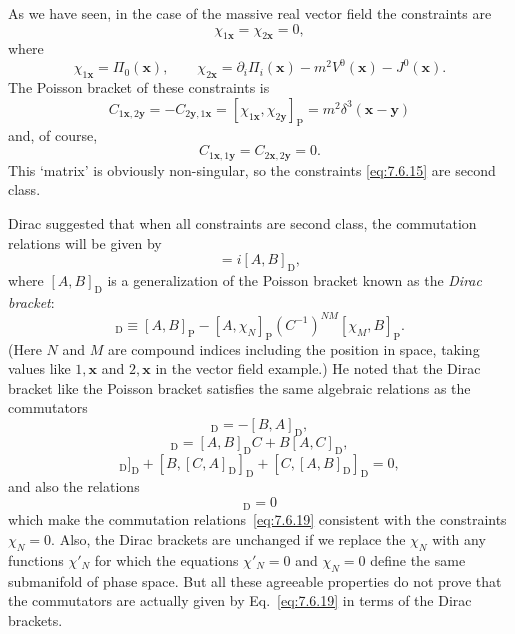 As we have seen, in the case of the massive real vector field the constraints
are
\begin{equation}
\chi_{1\mathbf x}=\chi_{2\mathbf x}=0,
\tag{7.6.15}\label{eq:7.6.15}
\end{equation}
where
\begin{equation}
\chi_{1\mathbf x}=\Pi_0(\mathbf x),\qquad
\chi_{2\mathbf x}=\partial_i\Pi_i(\mathbf x)-m^2V^0(\mathbf x)-J^0(\mathbf x).
\tag{7.6.16}\label{eq:7.6.16}
\end{equation}
The Poisson bracket of these constraints is
\begin{equation}
C_{1\mathbf x,2\mathbf y}=-C_{2\mathbf y,1\mathbf x}
=[\chi_{1\mathbf x},\chi_{2\mathbf y}]_{\mathrm P}
=m^2\delta^3(\mathbf x-\mathbf y)
\tag{7.6.17}\label{eq:7.6.17}
\end{equation}
and, of course,
\begin{equation}
C_{1\mathbf x,1\mathbf y}=C_{2\mathbf x,2\mathbf y}=0.
\tag{7.6.18}\label{eq:7.6.18}
\end{equation}
This `matrix' is obviously non-singular, so the constraints \eqref{eq:7.6.15} are
second class.

Dirac suggested that when all constraints are second class, the commutation
relations will be given by
\begin{equation}
[A,B]=i[A,B]_{\mathrm D},
\tag{7.6.19}\label{eq:7.6.19}
\end{equation}
where $[A,B]_{\mathrm D}$ is a generalization of the Poisson bracket known as
the \emph{Dirac bracket}:
\begin{equation}
[A,B]_{\mathrm D}\equiv[A,B]_{\mathrm P}
-[A,\chi_N]_{\mathrm P}(C^{-1})^{NM}[\chi_M,B]_{\mathrm P}.
\tag{7.6.20}\label{eq:7.6.20}
\end{equation}
(Here $N$ and $M$ are compound indices including the position in space,
taking values like $1,\mathbf x$ and $2,\mathbf x$ in the vector field
example.) He noted that the Dirac bracket like the Poisson bracket satisfies
the same algebraic relations as the commutators
\begin{equation}
[A,B]_{\mathrm D}=-[B,A]_{\mathrm D},
\tag{7.6.21}\label{eq:7.6.21}
\end{equation}
\begin{equation}
[A,BC]_{\mathrm D}=[A,B]_{\mathrm D}C+B[A,C]_{\mathrm D},
\tag{7.6.22}\label{eq:7.6.22}
\end{equation}
\begin{equation}
[A,[B,C]_{\mathrm D}]_{\mathrm D}
+[B,[C,A]_{\mathrm D}]_{\mathrm D}
+[C,[A,B]_{\mathrm D}]_{\mathrm D}=0,
\tag{7.6.23}\label{eq:7.6.23}
\end{equation}
and also the relations
\begin{equation}
[\chi_N,B]_{\mathrm D}=0
\tag{7.6.24}\label{eq:7.6.24}
\end{equation}
which make the commutation relations~\eqref{eq:7.6.19} consistent with the constraints
$\chi_N=0$. Also, the Dirac brackets are unchanged if we replace the $\chi_N$
with any functions $\chi'_N$ for which the equations $\chi'_N=0$ and
$\chi_N=0$ define the same submanifold of phase space. But all these
agreeable properties do not prove that the commutators are actually given by
Eq.~\eqref{eq:7.6.19} in terms of the Dirac brackets.


